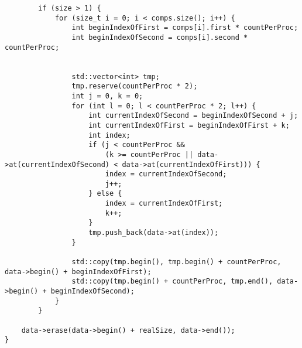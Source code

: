 \documentclass{report}
\begin{document}
\begin{lstlisting}
        if (size > 1) {
            for (size_t i = 0; i < comps.size(); i++) {
                int beginIndexOfFirst = comps[i].first * countPerProc;
                int beginIndexOfSecond = comps[i].second * countPerProc;


                std::vector<int> tmp;
                tmp.reserve(countPerProc * 2);
                int j = 0, k = 0;
                for (int l = 0; l < countPerProc * 2; l++) {
                    int currentIndexOfSecond = beginIndexOfSecond + j;
                    int currentIndexOfFirst = beginIndexOfFirst + k;
                    int index;
                    if (j < countPerProc &&
                        (k >= countPerProc || data->at(currentIndexOfSecond) < data->at(currentIndexOfFirst))) {
                        index = currentIndexOfSecond;
                        j++;
                    } else {
                        index = currentIndexOfFirst;
                        k++;
                    }
                    tmp.push_back(data->at(index));
                }

                std::copy(tmp.begin(), tmp.begin() + countPerProc, data->begin() + beginIndexOfFirst);
                std::copy(tmp.begin() + countPerProc, tmp.end(), data->begin() + beginIndexOfSecond);
            }
        }

    data->erase(data->begin() + realSize, data->end());
}
\end{lstlisting}
\end{document}
